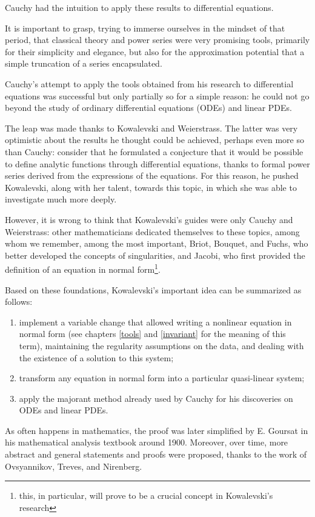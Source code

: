 Cauchy had the intuition to apply these results to differential equations.

It is important to grasp, trying to immerse ourselves in the mindset of that period, that classical theory and power series were very promising tools, primarily for their simplicity and elegance, but also for the approximation potential that a simple truncation of a series encapsulated.

Cauchy's attempt to apply the tools obtained from his research to differential equations was successful but only partially so for a simple reason: he could not go beyond the study of ordinary differential equations (ODEs) and linear PDEs.

The leap was made thanks to Kowalevski and Weierstrass. The latter was very optimistic about the results he thought could be achieved, perhaps even more so than Cauchy: consider that he formulated a conjecture that it would be possible to define analytic functions through differential equations, thanks to formal power series derived from the expressions of the equations. For this reason, he pushed Kowalevski, along with her talent, towards this topic, in which she was able to investigate much more deeply.

However, it is wrong to think that Kowalevski's guides were only Cauchy and Weierstrass: other mathematicians dedicated themselves to these topics, among whom we remember, among the most important, Briot, Bouquet, and Fuchs, who better developed the concepts of singularities, and Jacobi, who first provided the definition of an equation in normal form\footnote{this, in particular, will prove to be a crucial concept in Kowalevski's research}.

Based on these foundations, Kowalevski's important idea can be summarized as follows:
\begin{enumerate}
\item implement a variable change that allowed writing a nonlinear equation in normal form (see chapters \ref{tools} and \ref{invariant} for the meaning of this term), maintaining the regularity assumptions on the data, and dealing with the existence of a solution to this system;
\item transform any equation in normal form into a particular quasi-linear system;
\item apply the majorant method already used by Cauchy for his discoveries on ODEs and linear PDEs.
\end{enumerate}
As often happens in mathematics, the proof was later simplified by E. Goursat in his mathematical analysis textbook around 1900. Moreover, over time, more abstract and general statements and proofs were proposed, thanks to the work of Ovsyannikov, Treves, and Nirenberg.

